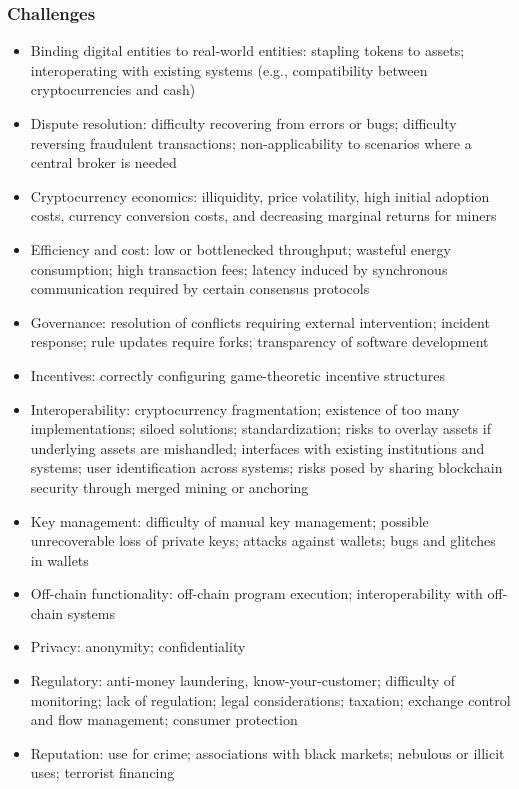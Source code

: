 {\subsubsection{Challenges}
\begin{itemize}
	\item{Binding digital entities to real-world entities: stapling tokens to assets; interoperating with existing systems (e.g., compatibility between cryptocurrencies and cash)}
	\item{Dispute resolution: difficulty recovering from errors or bugs; difficulty reversing fraudulent transactions; non-applicability to scenarios where a central broker is needed}
	\item{Cryptocurrency economics: illiquidity, price volatility, high initial adoption costs, currency conversion costs, and decreasing marginal returns for miners}
	\item{Efficiency and cost: low or bottlenecked throughput; wasteful energy consumption; high transaction fees; latency induced by synchronous communication required by certain consensus protocols}
	\item{Governance: resolution of conflicts requiring external intervention; incident response; rule updates require forks; transparency of software development}
	\item{Incentives: correctly configuring game-theoretic incentive structures}
	\item{Interoperability: cryptocurrency fragmentation; existence of too many implementations; siloed solutions; standardization; risks to overlay assets if underlying assets are mishandled; interfaces with existing institutions and systems; user identification across systems; risks posed by sharing blockchain security through merged mining or anchoring}
	\item{Key management: difficulty of manual key management; possible unrecoverable loss of private keys; attacks against wallets; bugs and glitches in wallets}
	\item{Off-chain functionality: off-chain program execution; interoperability with off-chain systems}
	\item{Privacy: anonymity; confidentiality}
	\item{Regulatory: anti-money laundering, know-your-customer; difficulty of monitoring; lack of regulation; legal considerations; taxation; exchange control and flow management; consumer protection}
	\item{Reputation: use for crime; associations with black markets; nebulous or illicit uses; terrorist financing}

\end{itemize}}

